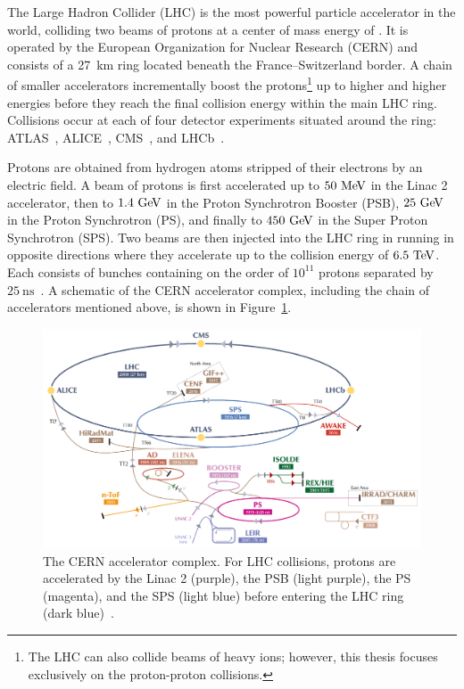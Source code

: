 ﻿The Large Hadron Collider (LHC) \cite{2008.LHC} is the most powerful particle accelerator in the world, colliding two beams of protons at a center of mass energy of .
It is operated by the European Organization for Nuclear Research (CERN) and consists of a 27~km ring located beneath the France--Switzerland border.
A chain of smaller accelerators incrementally boost the protons\footnote{The LHC can also collide beams of heavy ions; however, this thesis focuses exclusively on the proton-proton collisions.} up to higher and higher energies before they reach the final collision energy within the main LHC ring.
Collisions occur at each of four detector experiments situated around the ring: ATLAS~\cite{PERF-2007-01}, ALICE~\cite{2008.alice}, CMS~\cite{2008.cms}, and LHCb~\cite{2008.lhcb}.

Protons are obtained from hydrogen atoms stripped of their electrons by an electric field.
A beam of protons is first accelerated up to $50\mev$ in the Linac 2 accelerator, then to $1.4\gev$ in the Proton Synchrotron Booster (PSB), $25\gev$ in the Proton Synchrotron (PS), and finally to $450\gev$ in the Super Proton Synchrotron (SPS).
Two beams are then injected into the LHC ring in running in opposite directions where they accelerate up to the collision energy of $6.5\tev$.
Each consists of bunches containing on the order of $10^{11}$ protons separated by $25~\textrm{ns}$~\cite{2019.accelerator-complex}.
A schematic of the CERN accelerator complex, including the chain of accelerators mentioned above, is shown in Figure~\ref{fig:detector_accelerator_complex}.

\begin{figure}
  \centering
  \includegraphics[width=.9\textwidth]{figs/detector/accelerator-complex-small}
  \caption[The CERN accelerator complex.  For LHC collisions, protons are accelerated by the Linac 2 (purple), the PSB (light purple), the PS (magenta), and the SPS (light blue) before entering the LHC ring (dark blue).]{The CERN accelerator complex.  For LHC collisions, protons are accelerated by the Linac 2 (purple), the PSB (light purple), the PS (magenta), and the SPS (light blue) before entering the LHC ring (dark blue)~\cite{2016.accelerator-image}.}
  \label{fig:detector_accelerator_complex}
\end{figure}


